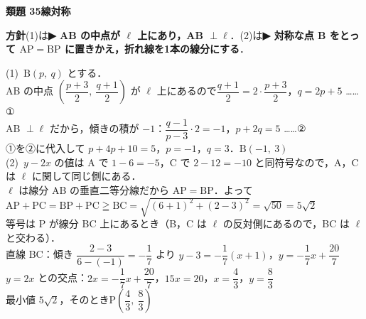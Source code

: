 \documentclass[a4paper,11pt]{ltjsarticle}
\newcommand{\ans}[2]{\Needspace{5\baselineskip}\vspace{6pt}%
  {\sffamily\bfseries 類題 #1\quad #2}\par}
\newcommand{\point}[1]{\textsf{\bfseries ▶ #1}}
\newcommand{\ax}[4]{\draw[->] (#1,0)--(#2,0) node[right]{\scriptsize $x$};
  \draw[->] (0,#3)--(0,#4) node[above]{\scriptsize $y$};
  \node[below left] at (0,0){\scriptsize O};}
\begin{document}
\ans{35}{線対称}
\begin{kai}
\textbf{方針}\quad (1)は\point{AB の中点が $\ell$ 上にあり，AB $\perp\ell$}．(2)は\point{対称な点 B をとって $\mathrm{AP}=\mathrm{BP}$ に置きかえ，折れ線を1本の線分にする}．\\[2pt]
\begin{center}
\end{center}
(1)\ $\mathrm B(p,\ q)$ とする．\\
\hspace*{1.5em}AB の中点 $\left(\dfrac{p+3}2,\ \dfrac{q+1}2\right)$ が $\ell$ 上にあるので\quad $\dfrac{q+1}2=2\cdot\dfrac{p+3}2$，\quad $q=2p+5$ ……①\\
\hspace*{1.5em}AB $\perp\ell$ だから，傾きの積が $-1$：\quad $\dfrac{q-1}{p-3}\cdot2=-1$，\quad $p+2q=5$ ……②\\
\hspace*{1.5em}①を②に代入して $p+4p+10=5$，$p=-1$，$q=3$．\quad $\mathrm B(-1,\ 3)$\\[2pt]
(2)\ $y-2x$ の値は A で $1-6=-5$，C で $2-12=-10$ と同符号なので，A，C は $\ell$ に関して同じ側にある．\\
\hspace*{1.5em}$\ell$ は線分 AB の垂直二等分線だから $\mathrm{AP}=\mathrm{BP}$．よって\\
\hspace*{1.5em}$\mathrm{AP}+\mathrm{PC}=\mathrm{BP}+\mathrm{PC}\geqq\mathrm{BC}=\sqrt{(6+1)^2+(2-3)^2}=\sqrt{50}=5\sqrt2$\\
\hspace*{1.5em}等号は P が線分 BC 上にあるとき（B，C は $\ell$ の反対側にあるので，BC は $\ell$ と交わる）．\\
\hspace*{1.5em}直線 BC：傾き $\dfrac{2-3}{6-(-1)}=-\dfrac17$ より $y-3=-\dfrac17(x+1)$，\quad $y=-\dfrac17x+\dfrac{20}7$\\
\hspace*{1.5em}$y=2x$ との交点：$2x=-\dfrac17x+\dfrac{20}7$，$15x=20$，$x=\dfrac43$，$y=\dfrac83$\\
\hspace*{1.5em}最小値 $5\sqrt2$，\quad そのとき\quad $\mathrm P\left(\dfrac43,\ \dfrac83\right)$
\end{kai}
\end{document}
